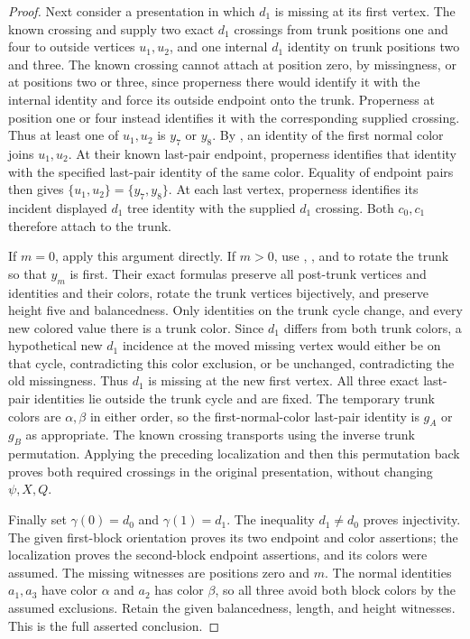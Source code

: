 \begin{proof}
Next consider a presentation in which $d_1$ is missing at its first
vertex.  The known crossing and
 supply two exact $d_1$ crossings
from trunk positions one and four to outside vertices $u_1,u_2$, and
one internal $d_1$ identity on trunk positions two and three.
The known crossing cannot attach at position zero, by missingness, or
at positions two or three, since properness there would identify it
with the internal identity and force its outside endpoint onto the
trunk.  Properness at position one or four instead identifies it with
the corresponding supplied crossing.  Thus at least one of $u_1,u_2$
is $y_7$ or $y_8$.
By , an identity of the first
normal color joins $u_1,u_2$.  At their known last-pair endpoint,
properness identifies that identity with the specified last-pair
identity of the same color.  Equality of endpoint pairs then gives
$\{u_1,u_2\}=\{y_7,y_8\}$.  At each last vertex, properness
identifies its incident displayed $d_1$ tree identity with the supplied
$d_1$ crossing.  Both $c_0,c_1$ therefore attach to the trunk.

If $m=0$, apply this argument directly.  If $m>0$, use
,
, and
 to rotate the trunk so that $y_m$
is first.  Their exact formulas preserve all post-trunk vertices and
identities and their colors, rotate the trunk vertices bijectively, and
preserve height five and balancedness.  Only identities on the trunk
cycle change, and every new colored value there is a trunk color.
Since $d_1$ differs from both trunk colors, a hypothetical new
$d_1$ incidence at the moved missing vertex would either be on that
cycle, contradicting this color exclusion, or be unchanged, contradicting
the old missingness.  Thus $d_1$ is missing at the new first vertex.
All three exact last-pair identities lie outside the trunk cycle and are
fixed.  The temporary trunk colors are $\alpha,\beta$ in either order,
so the first-normal-color last-pair identity is $g_A$ or $g_B$ as
appropriate.  The known crossing transports using the inverse trunk
permutation.  Applying the preceding localization and then this
permutation back proves both required crossings in the original
presentation, without changing $\psi,X,Q$.

Finally set $\gamma(0)=d_0$ and $\gamma(1)=d_1$.  The inequality
$d_1\ne d_0$ proves injectivity.  The given first-block orientation
proves its two endpoint and color assertions; the localization proves
the second-block endpoint assertions, and its colors were assumed.
The missing witnesses are positions zero and $m$.  The normal identities
$a_1,a_3$ have color $\alpha$ and $a_2$ has color $\beta$, so all
three avoid both block colors by the assumed exclusions.  Retain the
given balancedness, length, and height witnesses.  This is the full
asserted conclusion.
\end{proof}
